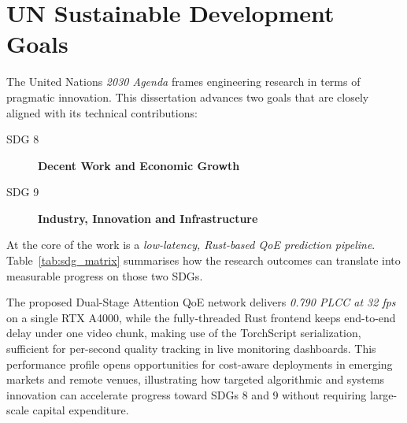 
\chapter*{UN Sustainable Development Goals}\label{chap:UnitedNations}

The United Nations \emph{2030 Agenda} frames engineering research in terms of
pragmatic innovation. This dissertation advances two goals that are closely aligned
with its technical contributions:

\begin{description}
  \item[SDG 8] \textbf{Decent Work and Economic Growth}
  \item[SDG 9] \textbf{Industry, Innovation and Infrastructure}
\end{description}

\noindent
At the core of the work is a \emph{low-latency, Rust-based QoE prediction
pipeline}. Table~\ref{tab:sdg_matrix} summarises how the research outcomes can translate
into measurable progress on those two SDGs.

The proposed Dual-Stage Attention QoE network delivers
\emph{0.790 PLCC at 32 fps} on a single RTX A4000, while the fully-threaded Rust
frontend keeps end-to-end delay under one video chunk, making use of the 
TorchScript serialization, sufficient for per-second quality tracking in live monitoring dashboards.
This performance profile opens opportunities for cost-aware deployments in
emerging markets and remote venues, illustrating how targeted algorithmic and
systems innovation can accelerate progress toward SDGs 8 and 9 without
requiring large-scale capital expenditure.

